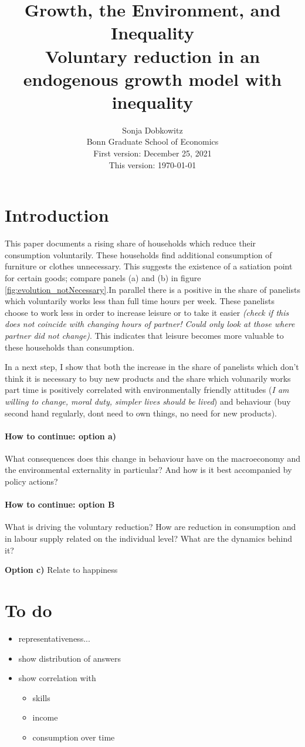 \documentclass[12pt]{article}
\title{Growth, the Environment, and Inequality\\ \small{ Voluntary reduction in an endogenous growth model with inequality}}
\date{Sonja Dobkowitz\\ Bonn Graduate School of Economics\\ %
	\vspace{1mm}
	First version: December 25, 2021\\
	This version: \today }
\begin{document}
	\maketitle
	
\section{Introduction}
This paper documents a rising share of households which reduce their consumption voluntarily. These households find additional consumption of furniture or clothes unnecessary. This suggests the existence of a satiation point for certain goods; compare panels (a) and (b) in figure \ref{fig:evolution_notNecessary}.In parallel there is a positive in the share of panelists which voluntarily works less than full time hours per week. These panelists choose to work less in order to increase leisure or to take it easier \textit{(check if this does not coincide with changing hours of partner! Could only look at those where partner did not change)}. This indicates that leisure becomes more valuable to these households than consumption. 

In a next step, I show that both the increase in the share of panelists which don't think it is necessary to buy new products and the share which volunarily works part time is positively correlated with environmentally friendly attitudes (\textit{I am willing to change, moral duty, simpler lives should be lived}) and behaviour (buy second hand regularly, dont need to own things, no need for new products). 

\paragraph{How to continue: option a)}
What consequences does this change in behaviour have on the macroeconomy and the environmental externality in particular? And how is it best accompanied by policy actions?

\paragraph{How to continue: option B}
What is driving the voluntary reduction? How are reduction in consumption and in labour supply related on the individual level?  What are the dynamics behind it?

\textbf{Option c)} Relate to happiness
\section{To do}
\begin{itemize}
	\item representativeness...
	\item show distribution of answers
	\item show correlation with 
	\begin{itemize}
		\item skills
		\item income
		\item consumption over time
	\end{itemize}
\end{itemize}
\end{document}
